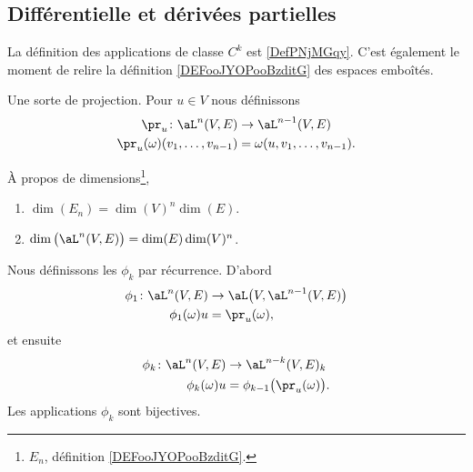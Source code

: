 \subsection{Différentielle et dérivées partielles}

La définition des applications de classe \( C^k\) est \ref{DefPNjMGqy}. C'est également le moment de relire la définition \ref{DEFooJYOPooBzditG} des espaces emboîtés.

\begin{definition}
	Une sorte de projection. Pour \( u\in V\) nous définissons
	\begin{equation}
		\begin{aligned}
			\pr_u\colon \aL^n(V,E)             & \to \aL^{n-1}(V,E)              \\
			\pr_u(\omega)(v_1,\ldots, v_{n-1}) & =\omega(u,v_1,\ldots, v_{n-1}).
		\end{aligned}
	\end{equation}
\end{definition}

\begin{lemma}      \label{LEMooSMZQooJBVySP}
	À propos de dimensions\footnote{\( E_n\), définition \ref{DEFooJYOPooBzditG}.},
	\begin{enumerate}
		\item       \label{ITEMooUWEBooSzFseN}
		      \( \dim(E_n)=\dim(V)^n\dim(E)\).
		\item       \label{ITEMooFMKQooFSMpgF}
		      \( \dim\big( \aL^n(V,E) \big)=\dim(E)\dim(V)^n\).
	\end{enumerate}
\end{lemma}

\begin{lemma}        \label{LEMooTDLNooTcPkLg}
	Nous définissons les \( \phi_k\) par récurrence. D'abord
	\begin{equation}
		\begin{aligned}
			\phi_1\colon \aL^n(V,E) & \to \aL\big( V,\aL^{n-1}(V,E) \big) \\
			\phi_1(\omega)u         & =\pr_u(\omega),
		\end{aligned}
	\end{equation}
	et ensuite
	\begin{equation}
		\begin{aligned}
			\phi_k\colon \aL^n(V,E) & \to \aL^{n-k}(V,E)_{k}                \\
			\phi_k(\omega)u         & =\phi_{k-1}\big( \pr_u(\omega) \big).
		\end{aligned}
	\end{equation}
	Les applications \( \phi_k\) sont bijectives.
\end{lemma}

